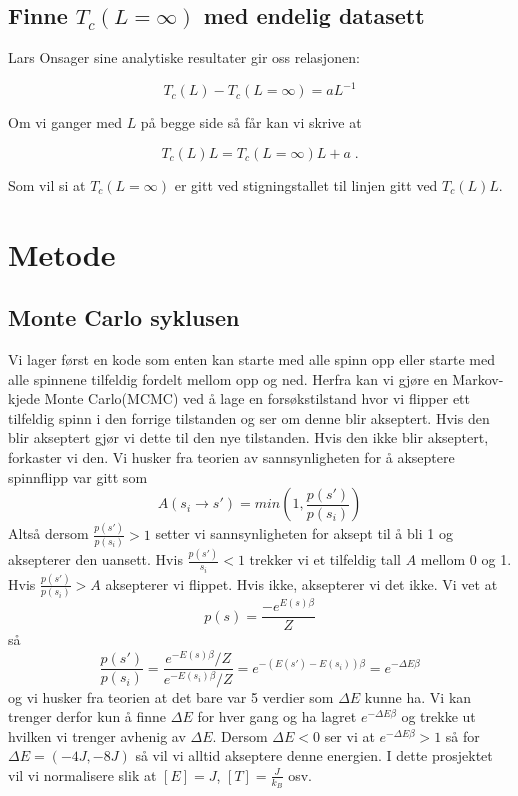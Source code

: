 \documentclass[reprint,english,notitlepage]{revtex4-2}  %
\begin{document}
\subsection{Finne $T_c \left ( L = \infty \right ) $ med endelig datasett}

Lars Onsager sine analytiske resultater gir oss relasjonen:

$$ T_c \left ( L \right ) - T_c \left ( L = \infty \right ) = aL^{-1}$$

Om vi ganger med $L$ på begge side så får kan vi skrive at

\begin{equation}\label{Tinf}
T_c \left (L \right ) L = T_c \left ( L = \infty \right )L + a \; .
\end{equation}

Som vil si at $T_c \left ( L = \infty \right ) $ er gitt ved stigningstallet til linjen gitt ved $T_c \left ( L \right ) L $.

\section{Metode}

\subsection{Monte Carlo syklusen}
Vi lager først en kode som enten kan starte med alle spinn opp eller starte med alle spinnene tilfeldig fordelt mellom opp og ned. Herfra kan vi gjøre en Markov-kjede Monte Carlo(MCMC) ved å lage en forsøkstilstand hvor vi flipper ett tilfeldig spinn i den forrige tilstanden og ser om denne blir akseptert. Hvis den blir akseptert gjør vi dette til den nye tilstanden. Hvis den ikke blir akseptert, forkaster vi den. Vi husker fra teorien av sannsynligheten for å akseptere spinnflipp var gitt som
$$
A(s_i\rightarrow s')=min(1, \frac{p(s')}{p(s_i)})
$$
Altså dersom $\frac{p(s')}{p(s_i)}>1$ setter vi sannsynligheten for aksept til å bli 1 og aksepterer den uansett. Hvis $\frac{p(s')}{s_i}<1$ trekker vi et tilfeldig tall $A$ mellom 0 og 1. Hvis $\frac{p(s')}{p(s_i)}>A$ aksepterer vi flippet. Hvis ikke, aksepterer vi det ikke. Vi vet at
$$
p(s)=\frac{-e^{E(s)\beta}}{Z}
$$
så
$$
\frac{p(s')}{p(s_i)}=\frac{e^{-E(s)\beta}/Z}{e^{-E(s_i)\beta}/Z}=e^{-(E(s')-E(s_i))\beta}=e^{-\Delta E \beta}
$$
og vi husker fra teorien at det bare var 5 verdier som $\Delta E$ kunne ha. Vi kan trenger derfor kun å finne $\Delta E$ for hver gang og ha lagret $e^{-\Delta E \beta}$ og trekke ut hvilken vi trenger avhenig av $\Delta E$. Dersom $\Delta E<0$ ser vi at $e^{-\Delta E \beta}>1$ så for $\Delta E=(-4J, -8J)$ så vil vi alltid akseptere denne energien. I dette prosjektet vil vi normalisere slik at $[E]=J$, $[T]=\frac{J}{k_B}$ osv.
\end{document}

